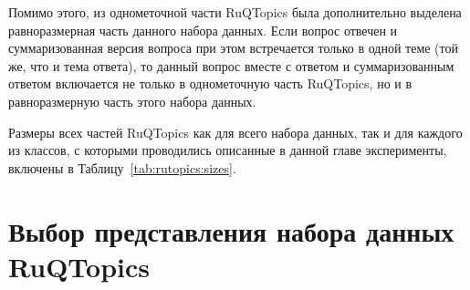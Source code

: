 Помимо этого, из однометочной части {RuQTopics} была дополнительно выделена равноразмерная часть данного набора данных. Если вопрос отвечен и суммаризованная версия вопроса при этом встречается только в одной теме (той же, что и тема ответа), то данный вопрос вместе с ответом и суммаризованным ответом включается не только в однометочную часть {RuQTopics}, но и в равноразмерную часть этого набора данных.
 
Размеры всех частей {RuQTopics} как для всего набора данных, так и для каждого из классов, с которыми проводились описанные в данной главе эксперименты, включены в Таблицу~\ref{tab:rutopics:sizes}.

\begin{table*}
\centering
{}
\caption{Размеры набора данных {RuQTopics} по классу и части}
\label{tab:rutopics:sizes}
\end{table*}


\section{Выбор представления набора данных {RuQTopics}}\label{rutopics:prepr}

